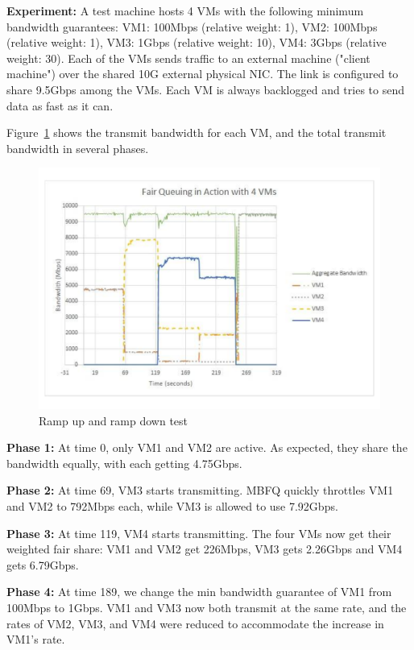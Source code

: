 {\bf Experiment:}  A test machine hosts 4 VMs with the following
minimum bandwidth guarantees: VM1: 100Mbps (relative weight: 1), VM2: 100Mbps
(relative weight: 1), VM3: 1Gbps (relative weight: 10), VM4: 3Gbps (relative
weight: 30). Each of the VMs sends traffic to an external machine ("client
machine") over the shared 10G external physical NIC.  The link is configured to
share 9.5Gbps among the VMs.  Each VM is always 
backlogged and tries to send data as fast as it can.

Figure~\ref{fairsharing}  shows the transmit bandwidth for each VM, and the
total transmit bandwidth in several phases. 

\begin{figure}[h]
\centering
\includegraphics[width=0.8\columnwidth,trim=60pt 20mm 0pt 8mm]{figures/fairsharing}
\caption{Ramp up and ramp down test}
\label{fairsharing}
\vspace{-3mm}
\end{figure}

{\bf Phase 1:}  At time 0, only VM1 and VM2 are active. As expected, they share
the bandwidth equally, with each getting 4.75Gbps.

{\bf Phase 2:} At time 69, VM3 starts transmitting. MBFQ quickly
throttles VM1 and VM2 to 792Mbps each, while VM3 is allowed to use 7.92Gbps. 

{\bf  Phase 3:} At time 119, VM4 starts transmitting. The four VMs now
get their weighted fair share: VM1 and VM2 get 226Mbps, VM3
gets 2.26Gbps and VM4 gets 6.79Gbps. 

{\bf  Phase 4:} At time 189, we change the min bandwidth guarantee of VM1 from
100Mbps to 1Gbps. VM1 and VM3 now both transmit at the same rate, and the rates
of VM2, VM3, and VM4 were reduced to accommodate the increase in VM1's rate.

